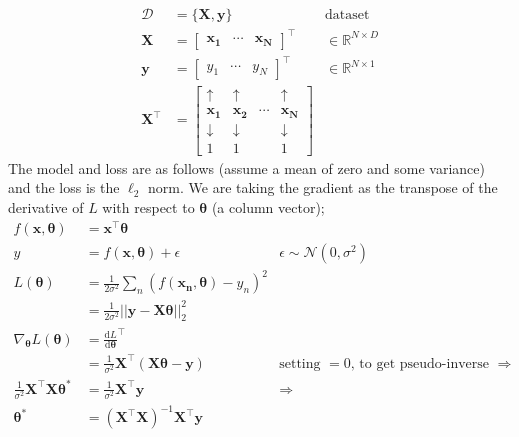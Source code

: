 \documentclass[a4paper, 12pt]{article}
\newcommand{\dif}[2]{\frac{\mathrm{d}#1}{\mathrm{d}#2}}
\newcommand{\summation}[2]{\sum\limits_{#1}^{#2}}
\newcommand{\mat}[1]{\boldsymbol{#1}}
\renewcommand{\vec}[1]{\boldsymbol{#1}}
\newcommand{\mbbr}[0]{\mathbb{R}}
\begin{document}
            \begin{align*}
                \mathcal{D} & = \{ \mat{X}, \mat{y} \} & \text{dataset} \\
                \mat{X} & = \begin{bmatrix}
                    \vec{x_1} & \cdots & \vec{x_N}
                \end{bmatrix}^\top & \in \mbbr^{N \times D} \\
                \mat{y} & = \begin{bmatrix}
                    y_1 & \cdots & y_N
                \end{bmatrix}^\top & \in \mbbr^{N \times 1} \\
                \mat{X}^\top & = \begin{bmatrix}
                    \uparrow & \uparrow & & \uparrow \\
                    \vec{x_1} & \vec{x_2} & \cdots & \vec{x_N} \\
                    \downarrow & \downarrow & & \downarrow \\
                    1 & 1 & & 1
                \end{bmatrix}
            \end{align*}
            The model and loss are as follows (assume a mean of zero and some variance) and the loss is the $\ell_2$ norm.
            We are taking the gradient as the transpose of the derivative of $L$ with respect to $\vec{\theta}$ (a column vector);
            \begin{align*}
                f(\vec{x}, \vec{\theta}) & = \vec{x}^\top\vec{\theta} \\
                y & = f(\vec{x}, \vec{\theta}) + \epsilon & \epsilon \sim \mathcal{N}(0, \sigma^2) \\
                L(\vec{\theta}) & = \frac{1}{2 \sigma^2} \summation{n}{} (f(\vec{x_n}, \vec{\theta}) - y_n)^2 \\
                & = \frac{1}{2 \sigma^2} || \mat{y} - \mat{X}\mat{\theta} ||_2^2 \\
                \nabla_{\vec{\theta}} L(\vec{\theta}) & = \dif{L}{\vec{\theta}}^\top \\
                & = \frac{1}{\sigma^2} \mat{X}^\top(\mat{X}\mat{\theta} - \mat{y}) & \text{setting $= 0$, to get pseudo-inverse $\Rightarrow$} \\
                \frac{1}{\sigma^2} \mat{X}^\top\mat{X}\mat{\theta^*} & = \frac{1}{\sigma^2} \mat{X}^\top\mat{y} & \Rightarrow \\
                \mat{\theta^*} & = (\mat{X}^\top\mat{X})^{-1}\mat{X}^\top\mat{y}
            \end{align*}
\end{document}
